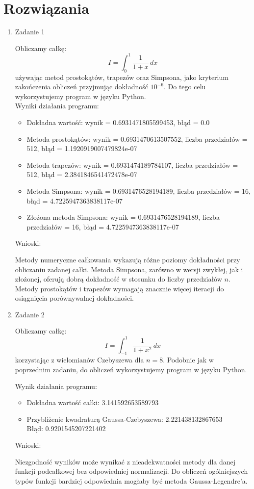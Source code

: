 \documentclass[10pt]{article}
\begin{document}
\section*{Rozwiązania}
\begin{enumerate}
  \item Zadanie 1

    Obliczamy całkę:
    \[
    I = \int_0^1 \frac{1}{1+x} \, dx
    \]
    używając metod prostokątów, trapezów oraz Simpsona, jako kryterium zakończenia obliczeń przyjmując dokładność $10^{-6}$. Do tego celu wykorzystujemy program w języku Python. \\


  Wyniki działania programu:

  \begin{itemize}
    \item Dokładna wartość: wynik = 0.6931471805599453, błąd = 0.0 
    \item Metoda prostokątów: wynik = 0.6931470613507552, liczba przedziałów = 512, błąd = 1.1920919007479824e-07 
    \item Metoda trapezów: wynik = 0.6931474189784107, liczba przedziałów = 512, błąd = 2.3841846541472478e-07 
    \item Metoda Simpsona: wynik = 0.6931476528194189, liczba przedziałów = 16, błąd = 4.7225947363838117e-07
    \item Złożona metoda Simpsona: wynik = 0.6931476528194189, liczba przedziałów = 16, błąd = 4.7225947363838117e-07 
\end{itemize}
    Wnioski:

    Metody numeryczne całkowania wykazują różne poziomy dokładności przy obliczaniu zadanej całki. 
    Metoda Simpsona, zarówno w wersji zwykłej, jak i złożonej, oferują dobrą dokładność w stosunku do liczby przedziałów \( n \). 
    Metody prostokątów i trapezów wymagają znacznie więcej iteracji do osiągnięcia porównywalnej dokładności.
\newpage
\item Zadanie 2

Obliczamy całkę:
\[
I = \int_{-1}^1 \frac{1}{1+x^2} \, dx
\]
korzystając z wielomianów Czebyszewa dla \( n=8 \). Podobnie jak w poprzednim zadaniu, do obliczeń wykorzystujemy program w języku Python.

Wynik działania programu:

\begin{itemize}
    \item Dokładna wartość całki:  3.141592653589793
    \item Przybliżenie kwadraturą Gaussa-Czebyszewa:  2.221438132867653\\
    Błąd:  0.9201545207221402
\end{itemize}

Wnioski:

Niezgodność wyników może wynikać z nieadekwatności metody dla danej funkcji podcałkowej bez odpowiedniej normalizacji. 
Do obliczeń ogólniejszych typów funkcji bardziej odpowiednia mogłaby być metoda Gaussa-Legendre’a.
\end{enumerate}
\end{document}
